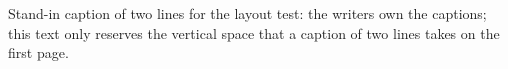 \documentclass[letterpaper,10pt,journal,twoside]{ieeeconf}
\begin{document}
\clearpage{}\begin{simbreaktable}\caption{Stand-in caption of two lines for the layout test: the writers own the captions; this text only reserves the vertical space that a caption of two lines takes on the first page.}\end{simbreaktable}\par{}\clearpage{}
\end{document}
